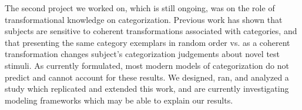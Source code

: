 \documentclass[12pt]{article}
\begin{document}
The second project we worked on, which is still ongoing, was on the role of transformational knowledge on categorization.  Previous work has shown that subjects are sensitive to coherent transformations associated with categories, and that presenting the same category exemplars in random order vs. as a coherent transformation changes subject's categorization judgements about novel test stimuli.  As currently formulated, most modern models of categorization do not predict and cannot account for these results.  We designed, ran, and analyzed a study which replicated and extended this work, and are currently investigating modeling frameworks which may be able to explain our results.  




\end{document}
